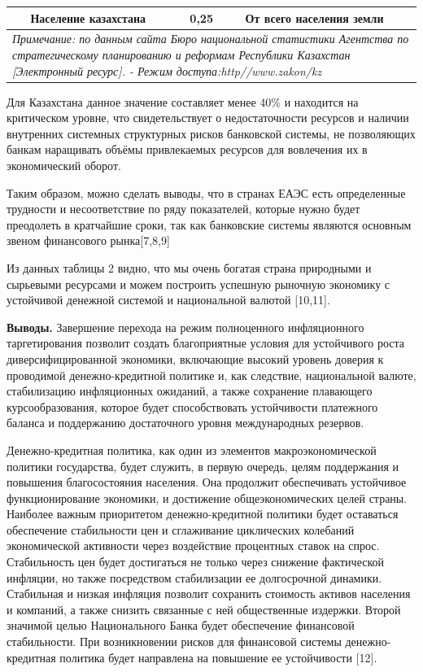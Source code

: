 \begin{table}[H]
\begin{tabular}{|llll|}
\multicolumn{1}{|l|}{} & \multicolumn{1}{l|}{Население казахстана} & \multicolumn{1}{l|}{0,25} & От всего населения земли \\ \hline
\multicolumn{4}{|p{0.6\textwidth}|}{\textit{Примечание: по данным сайта Бюро национальной статистики Агентства по стратегическому планированию и реформам Республики Казахстан {[}Электронный ресурс{]}. - Режим доступа:http//www.zakon/kz}} \\ \hline
\end{tabular}
\end{table}

\begin{multicols}{2}
Для Казахстана данное значение составляет менее 40\% и находится на
критическом уровне, что свидетельствует о недостаточности ресурсов и
наличии внутренних системных структурных рисков банковской системы, не
позволяющих банкам наращивать объёмы привлекаемых ресурсов для
вовлечения их в экономический оборот.

Таким образом, можно сделать выводы, что в странах ЕАЭС есть
определенные трудности и несоответствие по ряду показателей, которые
нужно будет преодолеть в кратчайшие сроки, так как банковские системы
являются основным звеном финансового рынка{[}7,8,9{]}

Из данных таблицы 2 видно, что мы очень богатая страна природными и
сырьевыми ресурсами и можем построить успешную рыночную экономику с
устойчивой денежной системой и национальной валютой {[}10,11{]}.

{\bfseries Выводы.} Завершение перехода на режим полноценного инфляционного
таргетирования позволит создать благоприятные условия для устойчивого
роста диверсифицированной экономики, включающие высокий уровень доверия
к проводимой денежно-кредитной политике и, как следствие, национальной
валюте, стабилизацию инфляционных ожиданий, а также сохранение
плавающего курсообразования, которое будет способствовать устойчивости
платежного баланса и поддержанию достаточного уровня международных
резервов.

Денежно-кредитная политика, как один из элементов макроэкономической
политики государства, будет служить, в первую очередь, целям поддержания
и повышения благосостояния населения. Она продолжит обеспечивать
устойчивое функционирование экономики, и достижение общеэкономических
целей страны. Наиболее важным приоритетом денежно-кредитной политики
будет оставаться обеспечение стабильности цен и сглаживание циклических
колебаний экономической активности через воздействие процентных ставок
на спрос. Стабильность цен будет достигаться не только через снижение
фактической инфляции, но также посредством стабилизации ее долгосрочной
динамики. Стабильная и низкая инфляция позволит сохранить стоимость
активов населения и компаний, а также снизить связанные с ней
общественные издержки. Второй значимой целью Национального Банка будет
обеспечение финансовой стабильности. При возникновении рисков для
финансовой системы денежно-кредитная политика будет направлена на
повышение ее устойчивости {[}12{]}.
\end{multicols}

